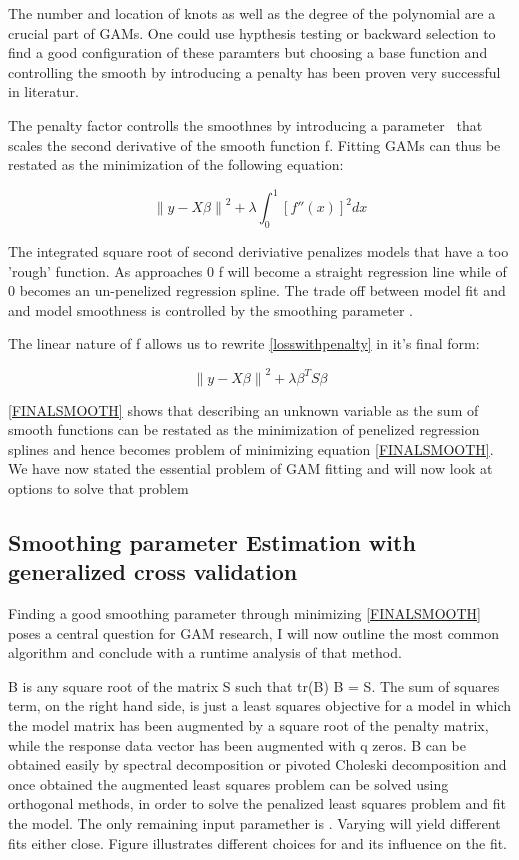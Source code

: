 \documentclass{article}
\begin{document}
    The number and location of knots as well as the degree of the polynomial are a crucial part of GAMs. One could use hypthesis testing or backward selection to find a good configuration of these paramters but choosing a base function and controlling the smooth by introducing a penalty has been proven very successful in literatur.

    The penalty factor controlls the smoothnes by introducing a parameter \textlambda\ that scales the second derivative of the smooth function f. Fitting GAMs can thus be restated as the minimization of the following equation:

    \begin{equation} \label{losswithpenalty} \left \| y - X\beta  \right \|^2 + \lambda \int_{0}^{1} [{f}''(x)]^2 dx \end{equation}

    The integrated square root of second deriviative penalizes models that have a too 'rough' function. As \textlambda approaches 0 f will become a straight regression line while \textlambda of 0 becomes an un-penelized regression spline. The trade off between model fit and and model smoothness is controlled by the smoothing parameter \textlambda.

    The linear nature of f allows us to rewrite \ref{losswithpenalty} in it's final form:

    \begin{equation} \label{FINALSMOOTH} \left \| y - X\beta  \right \|^2 + \lambda \beta^T S\beta  \end{equation}

    \ref{FINALSMOOTH} shows that describing an unknown variable as the sum of smooth functions can be restated as the minimization of penelized regression splines and hence becomes problem of minimizing equation \ref{FINALSMOOTH}. We have now stated the essential problem of GAM fitting and will now look at options to solve that problem

    \subsection{Smoothing parameter Estimation with generalized cross validation}
    Finding a good smoothing parameter through minimizing \ref{FINALSMOOTH} poses a central question for GAM research, I will now outline the most common algorithm and conclude with a runtime analysis of that method.

     B is any square root of the matrix S such that tr(B) B = S. The sum of squares term, on the right hand side, is just a least squares objective for a model in which the model matrix has been augmented by a square root of the penalty matrix, while the response data vector has been augmented with q zeros. B can be obtained easily by spectral decomposition or pivoted Choleski decomposition and once obtained the augmented least squares problem can be solved using orthogonal methods, in order to solve the penalized least squares problem and fit the model. The only remaining input paramether is \textlambda. Varying \textlambda will yield different fits either close. Figure illustrates different choices for \textlambda and its influence on the fit.
\end{document}
